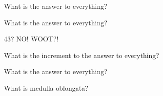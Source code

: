 \documentclass[12pt]{article}
\begin{document}
\begin{myexercise}
	What is the answer to everything?
\end{myexercise}

\begin{myexercise}
	What is the answer to everything?
\end{myexercise}
43?
NO!
WOOT?!

\begin{myexercise}[newpage]
	What is the increment to the answer to everything?
\end{myexercise}

\begin{myexercise}
	What is the answer to everything?
\end{myexercise}

What is medulla oblongata?
\printindex
\end{document}
